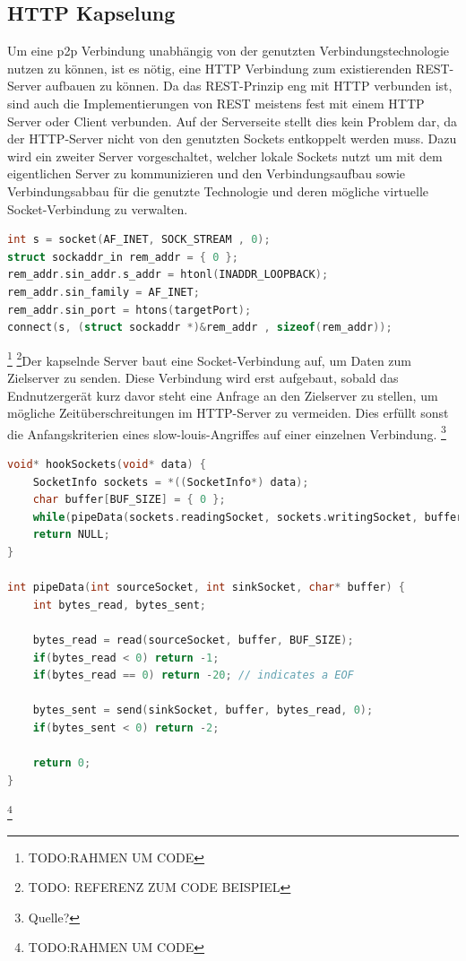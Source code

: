 \documentclass[12pt,a4paper]{article}
\begin{document}
    \subsection{HTTP Kapselung}
        Um eine p2p Verbindung unabhängig von der genutzten Verbindungstechnologie nutzen zu können, ist es nötig, eine HTTP Verbindung zum existierenden REST-Server aufbauen zu können. Da das REST-Prinzip eng mit HTTP verbunden ist, sind auch die Implementierungen von REST meistens fest mit einem HTTP Server oder Client verbunden. Auf der Serverseite stellt dies kein Problem dar, da der HTTP-Server nicht von den genutzten Sockets entkoppelt werden muss. Dazu wird ein zweiter Server vorgeschaltet, welcher lokale Sockets nutzt um mit dem eigentlichen Server zu kommunizieren und den Verbindungsaufbau sowie Verbindungsabbau für die genutzte Technologie und deren mögliche virtuelle Socket-Verbindung zu verwalten.
        
        \begin{lstlisting}[language=C, caption=Instanziierung eines Sockets (Server: C)]
int s = socket(AF_INET, SOCK_STREAM , 0);
struct sockaddr_in rem_addr = { 0 };
rem_addr.sin_addr.s_addr = htonl(INADDR_LOOPBACK);
rem_addr.sin_family = AF_INET;
rem_addr.sin_port = htons(targetPort);
connect(s, (struct sockaddr *)&rem_addr , sizeof(rem_addr));
        \end{lstlisting}\footnote{TODO:RAHMEN UM CODE}
        \footnote{TODO: REFERENZ ZUM CODE BEISPIEL}Der kapselnde Server baut eine Socket-Verbindung auf, um Daten zum Zielserver zu senden. Diese Verbindung wird erst aufgebaut, sobald das Endnutzergerät kurz davor steht eine Anfrage an den Zielserver zu stellen, um mögliche Zeitüberschreitungen im HTTP-Server zu vermeiden. Dies erfüllt sonst die Anfangskriterien eines slow-louis-Angriffes auf einer einzelnen Verbindung. \footnote{Quelle?}
        \begin{lstlisting}[language=C, caption=Datenweiterleitung durch Sockets (Server: C)]
void* hookSockets(void* data) {
    SocketInfo sockets = *((SocketInfo*) data);
    char buffer[BUF_SIZE] = { 0 };
    while(pipeData(sockets.readingSocket, sockets.writingSocket, buffer) >= 0) { ;; }
    return NULL;
}        
        
int pipeData(int sourceSocket, int sinkSocket, char* buffer) {
    int bytes_read, bytes_sent;

    bytes_read = read(sourceSocket, buffer, BUF_SIZE);
    if(bytes_read < 0) return -1;
    if(bytes_read == 0) return -20; // indicates a EOF

    bytes_sent = send(sinkSocket, buffer, bytes_read, 0);
    if(bytes_sent < 0) return -2;

    return 0;
}
        \end{lstlisting}\footnote{TODO:RAHMEN UM CODE}
        
\end{document}
